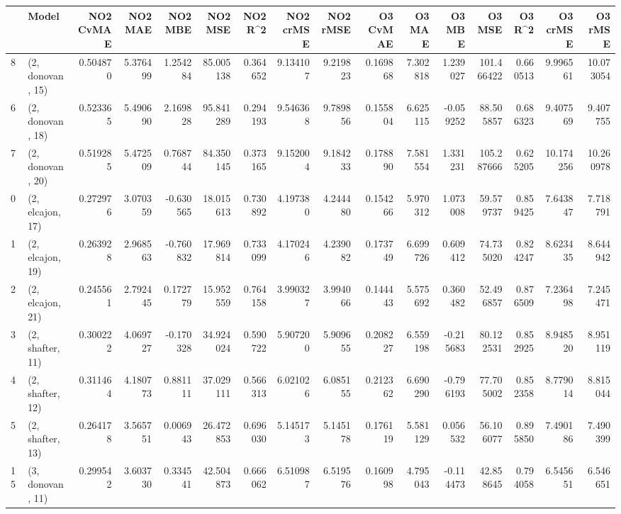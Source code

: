 \begin{tabular}{llrrrrrrrrrrrrrr}
\toprule
{} &             Model &  NO2 CvMAE &   NO2 MAE &   NO2 MBE &     NO2 MSE &   NO2 R\textasciicircum2 &  NO2 crMSE &   NO2 rMSE &  O3 CvMAE &     O3 MAE &    O3 MBE &      O3 MSE &    O3 R\textasciicircum2 &   O3 crMSE &    O3 rMSE \\
\midrule
8  &  (2, donovan, 15) &   0.504870 &  5.376499 &  1.254284 &   85.005138 &  0.364652 &   9.134107 &   9.219823 &  0.169868 &   7.302818 &  1.239027 &  101.466422 &  0.660513 &   9.996561 &  10.073054 \\
6  &  (2, donovan, 18) &   0.523365 &  5.490690 &  2.169828 &   95.841289 &  0.294193 &   9.546368 &   9.789856 &  0.155804 &   6.625115 & -0.059252 &   88.505857 &  0.686323 &   9.407569 &   9.407755 \\
7  &  (2, donovan, 20) &   0.519285 &  5.472509 &  0.768744 &   84.350145 &  0.373165 &   9.152004 &   9.184233 &  0.178890 &   7.581554 &  1.331231 &  105.287666 &  0.625205 &  10.174256 &  10.260978 \\
0  &  (2, elcajon, 17) &   0.272976 &  3.070359 & -0.630565 &   18.015613 &  0.730892 &   4.197380 &   4.244480 &  0.154266 &   5.970312 &  1.073008 &   59.579737 &  0.859425 &   7.643847 &   7.718791 \\
1  &  (2, elcajon, 19) &   0.263928 &  2.968563 & -0.760832 &   17.969814 &  0.733099 &   4.170246 &   4.239082 &  0.173749 &   6.699726 &  0.609412 &   74.735020 &  0.824247 &   8.623435 &   8.644942 \\
2  &  (2, elcajon, 21) &   0.245561 &  2.792445 &  0.172779 &   15.952559 &  0.764158 &   3.990327 &   3.994066 &  0.144443 &   5.575692 &  0.360482 &   52.496857 &  0.876509 &   7.236498 &   7.245471 \\
3  &  (2, shafter, 11) &   0.300222 &  4.069727 & -0.170328 &   34.924024 &  0.590722 &   5.907200 &   5.909655 &  0.208227 &   6.559198 & -0.215683 &   80.122531 &  0.852925 &   8.948520 &   8.951119 \\
4  &  (2, shafter, 12) &   0.311464 &  4.180773 &  0.881111 &   37.029111 &  0.566313 &   6.021026 &   6.085155 &  0.212362 &   6.690290 & -0.796193 &   77.705002 &  0.852358 &   8.779014 &   8.815044 \\
5  &  (2, shafter, 13) &   0.264178 &  3.565751 &  0.006943 &   26.472853 &  0.696030 &   5.145173 &   5.145178 &  0.176119 &   5.581129 &  0.056532 &   56.106077 &  0.895850 &   7.490186 &   7.490399 \\
15 &  (3, donovan, 11) &   0.299542 &  3.603730 &  0.334541 &   42.504873 &  0.666062 &   6.510987 &   6.519576 &  0.160998 &   4.795043 & -0.114473 &   42.858645 &  0.794058 &   6.545651 &   6.546651 \\

\end{tabular}
